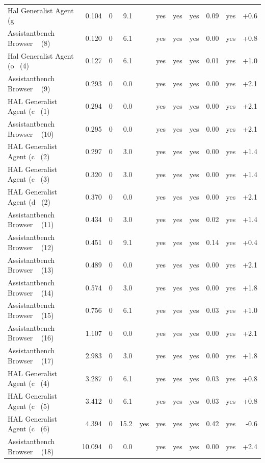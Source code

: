 {\begin{longtable}{lrrrcccccrr}
Hal Generalist Agent (g~ & 0.104 & 0 & 9.1 &  & yes & yes & yes & 0.09 & yes & +0.6 \\
Assistantbench Browser ~ (8) & 0.120 & 0 & 6.1 &  & yes & yes & yes & 0.00 & yes & +0.8 \\
Hal Generalist Agent (o~ (4) & 0.127 & 0 & 6.1 &  & yes & yes & yes & 0.01 & yes & +1.0 \\
Assistantbench Browser ~ (9) & 0.293 & 0 & 0.0 &  & yes & yes & yes & 0.00 & yes & +2.1 \\
HAL Generalist Agent (c~ (1) & 0.294 & 0 & 0.0 &  & yes & yes & yes & 0.00 & yes & +2.1 \\
Assistantbench Browser ~ (10) & 0.295 & 0 & 0.0 &  & yes & yes & yes & 0.00 & yes & +2.1 \\
HAL Generalist Agent (c~ (2) & 0.297 & 0 & 3.0 &  & yes & yes & yes & 0.00 & yes & +1.4 \\
HAL Generalist Agent (c~ (3) & 0.320 & 0 & 3.0 &  & yes & yes & yes & 0.00 & yes & +1.4 \\
HAL Generalist Agent (d~ (2) & 0.370 & 0 & 0.0 &  & yes & yes & yes & 0.00 & yes & +2.1 \\
Assistantbench Browser ~ (11) & 0.434 & 0 & 3.0 &  & yes & yes & yes & 0.02 & yes & +1.4 \\
Assistantbench Browser ~ (12) & 0.451 & 0 & 9.1 &  & yes & yes & yes & 0.14 & yes & +0.4 \\
Assistantbench Browser ~ (13) & 0.489 & 0 & 0.0 &  & yes & yes & yes & 0.00 & yes & +2.1 \\
Assistantbench Browser ~ (14) & 0.574 & 0 & 3.0 &  & yes & yes & yes & 0.00 & yes & +1.8 \\
Assistantbench Browser ~ (15) & 0.756 & 0 & 6.1 &  & yes & yes & yes & 0.03 & yes & +1.0 \\
Assistantbench Browser ~ (16) & 1.107 & 0 & 0.0 &  & yes & yes & yes & 0.00 & yes & +2.1 \\
Assistantbench Browser ~ (17) & 2.983 & 0 & 3.0 &  & yes & yes & yes & 0.00 & yes & +1.8 \\
HAL Generalist Agent (c~ (4) & 3.287 & 0 & 6.1 &  & yes & yes & yes & 0.03 & yes & +0.8 \\
HAL Generalist Agent (c~ (5) & 3.412 & 0 & 6.1 &  & yes & yes & yes & 0.03 & yes & +0.8 \\
HAL Generalist Agent (c~ (6) & 4.394 & 0 & 15.2 & yes & yes & yes & yes & 0.42 & yes & -0.6 \\
Assistantbench Browser ~ (18) & 10.094 & 0 & 0.0 &  & yes & yes & yes & 0.00 & yes & +2.4 \\
\end{longtable}

}
